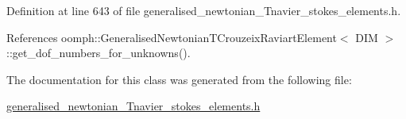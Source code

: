 Definition at line 643 of file generalised\+\_\+newtonian\+\_\+\+Tnavier\+\_\+stokes\+\_\+elements.\+h.



References oomph\+::\+Generalised\+Newtonian\+T\+Crouzeix\+Raviart\+Element$<$ D\+I\+M $>$\+::get\+\_\+dof\+\_\+numbers\+\_\+for\+\_\+unknowns().



The documentation for this class was generated from the following file\+:\begin{DoxyCompactItemize}
\item 
\hyperlink{generalised__newtonian__Tnavier__stokes__elements_8h}{generalised\+\_\+newtonian\+\_\+\+Tnavier\+\_\+stokes\+\_\+elements.\+h}\end{DoxyCompactItemize}
